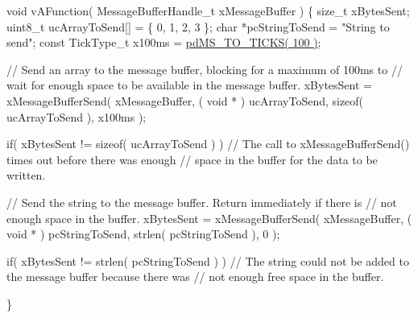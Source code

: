 \begin{DoxyPre}
\begin{DoxyPre}
\begin{DoxyPre}
void vAFunction( MessageBufferHandle\_t xMessageBuffer )
\{
size\_t xBytesSent;
uint8\_t ucArrayToSend[] = \{ 0, 1, 2, 3 \};
char *pcStringToSend = "String to send";
const TickType\_t x100ms = \hyperlink{projdefs_8h_a353d0f62b82a402cb3db63706c81ec3f}{pdMS\_TO\_TICKS( 100 )};
\begin{DoxyVerb}// Send an array to the message buffer, blocking for a maximum of 100ms to
// wait for enough space to be available in the message buffer.
xBytesSent = xMessageBufferSend( xMessageBuffer, ( void * ) ucArrayToSend, sizeof( ucArrayToSend ), x100ms );

if( xBytesSent != sizeof( ucArrayToSend ) )
{
    // The call to xMessageBufferSend() times out before there was enough
    // space in the buffer for the data to be written.
}

// Send the string to the message buffer.  Return immediately if there is
// not enough space in the buffer.
xBytesSent = xMessageBufferSend( xMessageBuffer, ( void * ) pcStringToSend, strlen( pcStringToSend ), 0 );

if( xBytesSent != strlen( pcStringToSend ) )
{
    // The string could not be added to the message buffer because there was
    // not enough free space in the buffer.
}
\end{DoxyVerb}

\}
\end{DoxyPre}
 \end{DoxyPre}
\end{DoxyPre}
